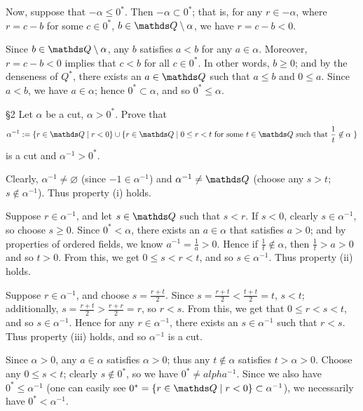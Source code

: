 \documentclass{homework}
\begin{document}
\begin{solution}
\begin{enumerate}[label=(\alph*)]
      Now, suppose that $-\alpha\le 0^*$. Then $-\alpha\subset 0^*$; that is, for any $r\in
      -\alpha$, where $r=c-b$ for some $c\in 0^*$, $b\in \Q\setminus \alpha$, we have $r=c-b<0$.

      Since $b\in \Q\setminus \alpha$, any $b$ satisfies $a<b$ for any $a\in \alpha$. Moreover,
      $r=c-b<0$ implies that $c<b$ for all $c\in 0^*$. In other words, $b\ge 0$; and by the
      denseness of $Q^*$, there exists an $a\in \Q$ such that $a\le b$ and $0\le a$. Since $a<b$, we
      have $a\in \alpha$; hence $0^*\subset \alpha$, and so $0^*\le \alpha$.
  \end{enumerate}
\end{solution}

\begin{problem}{\S 2}
  Let $ \alpha$ be a cut, $\alpha>0^*$. Prove that \[
    \alpha^{-1} := \{r\in \Q\mid r<0\} \cup \{r\in \Q\mid 0\le r<t~\text{for some $t\in \Q$ such that
    $\frac{1}{t}\not\in \alpha$}~\} 
  \] is a cut and $\alpha^{-1}>0^*$.
\end{problem}
\begin{solution}
  Clearly, $ \alpha^{-1}\neq \varnothing$ (since $-1\in \alpha^{-1}$) and $ \alpha^{-1}\neq \Q$
  (choose any $s>t$; $s\not\in \alpha^{-1}$). Thus property (i) holds.

  Suppose $r\in \alpha^{-1}$, and let $s \in \Q$ such that $s<r$. If $s<0$, clearly $s \in
  \alpha^{-1}$, so choose $s\ge 0$. Since $0^*<\alpha$, there exists an $a\in \alpha$ that satisfies
  $a>0$; and by properties of ordered fields, we know $a^{-1}=\frac{1}{a}>0$. Hence if
  $\frac{1}{t}\not\in \alpha$, then $\frac{1}{t}>a>0$ and so $t>0$. From this, we get $0\le s<r<t$,
  and so $s \in \alpha^{-1}$. Thus property (ii) holds.

  Suppose $r\in \alpha^{-1}$, and choose $s=\frac{r+t}{2}$. Since $s=\frac{r+t}{2}<\frac{t+t}{2}=t$,
  $s<t$; additionally, $s=\frac{r+t}{2}>\frac{r+r}{2}=r$, so $r<s$. From this, we get that $0\le
  r<s<t$, and so $s \in \alpha^{-1}$. Hence for any $r\in\alpha^{-1}$, there exists an $s \in
  \alpha^{-1}$ such that $r<s$. Thus property (iii) holds, and so $\alpha^{-1}$ is a cut.

  Since $\alpha>0$, any $a\in \alpha$ satisfies $\alpha>0$; thus any $t\not\in \alpha$ satisfies
  $t>\alpha>0$. Choose any $0\le s<t$; clearly $s\not\in 0^*$, so we have $0^*\neq alpha^{-1}$.
  Since we also have $0^*\le  \alpha^{-1}$ (one can easily see $0^*=\{r\in \Q\mid r<0\}\subset
  \alpha^{-1} $), we necessarily have $0^* < \alpha^{-1}$.
\end{solution}
\end{document}
